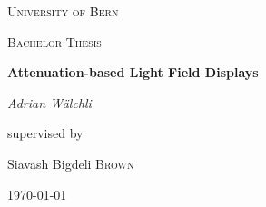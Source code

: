 \begin{titlepage}
	\centering
	{\scshape\LARGE University of Bern \par}
	\vspace{1cm}
	{\scshape\Large Bachelor Thesis \par}
	\vspace{1.5cm}
	{\huge\bfseries Attenuation-based Light Field Displays \par}
	\vspace{2cm}
	{\Large\itshape Adrian Wälchli\par}
	\vfill
	supervised by \par
	Siavash Bigdeli \textsc{Brown}
	\vfill
	{\large \today \par}
\end{titlepage}